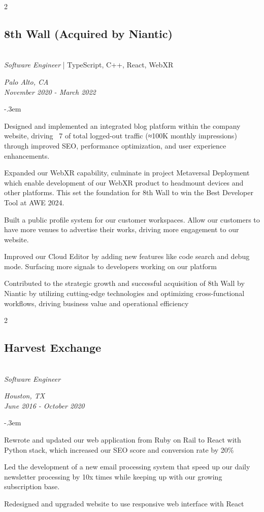 \documentclass{article}
\let\olditemize=\itemize \let\endolditemize=\enditemize
\renewenvironment{itemize}{\olditemize[topsep=0em] \itemsep-.3em}{\endolditemize}
\newenvironment{twocolentry}[2][]{
    \def\secondColumn{#2}
    \raggedright
    \setcolumnwidth{\fill, 6cm}
    \begin{paracol}{2}
}{
    \switchcolumn \raggedleft \secondColumn
    \end{paracol}
} %
\begin{document}
\begin{twocolentry}{
  \textit{Palo Alto, CA} \\
  \textit{November 2020 - March 2022}
}
\subsection{8th Wall (Acquired by Niantic)}\hfill\\
\textit{Software Engineer} | TypeScript, C++, React, WebXR
\end{twocolentry}
\begin{itemize}
  \item Designed and implemented an integrated blog platform within the company website, driving ~7%
  of total logged-out traffic (≈100K monthly impressions) through improved SEO, performance
  optimization, and user experience enhancements.
  \item Expanded our WebXR capability, culminate in project Metaversal Deployment which enable
  development of our WebXR product to headmount devices and other platforms. This set the foundation
  for 8th Wall to win the Best Developer Tool at AWE 2024.
  \item Built a public profile system for our customer workspaces. Allow our customers to have more
  venues to advertise their works, driving more engagement to our website. 
  \item Improved our Cloud Editor by adding new features like code search and debug mode. Surfacing
  more signals to developers working on our platform
  \item Contributed to the strategic growth and successful acquisition of 8th Wall by Niantic by
  utilizing cutting-edge technologies and optimizing cross-functional workflows, driving business
  value and operational efficiency
\end{itemize}

\begin{twocolentry}{
  \textit{Houston, TX} \\
  \textit{June 2016 - October 2020} \\
}
\subsection{Harvest Exchange}\hfill\\
\textit{Software Engineer}
\end{twocolentry}
\begin{itemize}
  \item Rewrote and updated our web application from Ruby on Rail to React with Python stack, which
  increased our SEO score and conversion rate by 20\%
  \item Led the development of a new email processing system that speed up our daily newsletter
  processing by 10x times while keeping up with our growing subscription base.
  \item Redesigned and upgraded website to use responsive web interface with React
\end{itemize}
\end{document}
